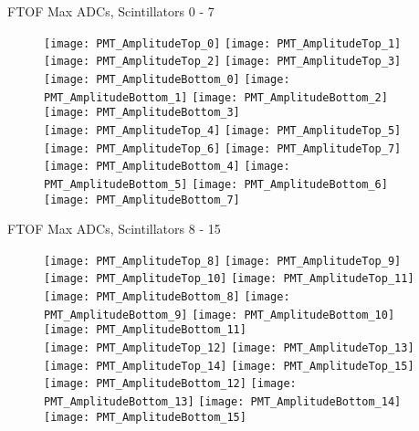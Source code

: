 \documentclass[11pt]{beamer}
\begin{document}
\begin{frame}{FTOF Max ADCs, Scintillators 0 - 7}
\begin{figure}
\centering
\texttt{[image: PMT\_AmplitudeTop\_0]}
\texttt{[image: PMT\_AmplitudeTop\_1]}
\texttt{[image: PMT\_AmplitudeTop\_2]}
\texttt{[image: PMT\_AmplitudeTop\_3]} \\ 
\texttt{[image: PMT\_AmplitudeBottom\_0]}
\texttt{[image: PMT\_AmplitudeBottom\_1]}
\texttt{[image: PMT\_AmplitudeBottom\_2]}
\texttt{[image: PMT\_AmplitudeBottom\_3]} \\
\texttt{[image: PMT\_AmplitudeTop\_4]}
\texttt{[image: PMT\_AmplitudeTop\_5]}
\texttt{[image: PMT\_AmplitudeTop\_6]}
\texttt{[image: PMT\_AmplitudeTop\_7]} \\
\texttt{[image: PMT\_AmplitudeBottom\_4]}
\texttt{[image: PMT\_AmplitudeBottom\_5]}
\texttt{[image: PMT\_AmplitudeBottom\_6]}
\texttt{[image: PMT\_AmplitudeBottom\_7]} \\
\end{figure}
\end{frame}

\begin{frame}{FTOF Max ADCs, Scintillators 8 - 15}
\begin{figure}
\centering
\texttt{[image: PMT\_AmplitudeTop\_8]}
\texttt{[image: PMT\_AmplitudeTop\_9]}
\texttt{[image: PMT\_AmplitudeTop\_10]}
\texttt{[image: PMT\_AmplitudeTop\_11]} \\ 
\texttt{[image: PMT\_AmplitudeBottom\_8]}
\texttt{[image: PMT\_AmplitudeBottom\_9]}
\texttt{[image: PMT\_AmplitudeBottom\_10]}
\texttt{[image: PMT\_AmplitudeBottom\_11]} \\
\texttt{[image: PMT\_AmplitudeTop\_12]}
\texttt{[image: PMT\_AmplitudeTop\_13]}
\texttt{[image: PMT\_AmplitudeTop\_14]}
\texttt{[image: PMT\_AmplitudeTop\_15]} \\
\texttt{[image: PMT\_AmplitudeBottom\_12]}
\texttt{[image: PMT\_AmplitudeBottom\_13]}
\texttt{[image: PMT\_AmplitudeBottom\_14]}
\texttt{[image: PMT\_AmplitudeBottom\_15]} \\
\end{figure}
\end{frame}
\end{document}
